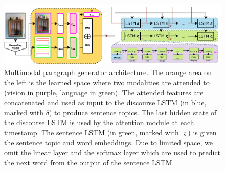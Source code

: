 \documentclass[11pt,a4paper]{article}
\newcommand{\kibitz}[2]{\ifnum\Comments=1\textcolor{#1}{#2}\fi}
\newcommand{\nikolai}[1]{\kibitz{red}   {[Nikolai: #1]}}
\begin{document}







\begin{figure}[t]
 \includegraphics[width=\linewidth]{figures/model}
 \caption{Multimodal paragraph generator architecture.
 		The orange area on the left is the learned space where two modalities are attended to (vision in purple, language in green).
		The attended features are concatenated and used as input to the discourse LSTM (in blue, marked with $\delta$) to produce sentence topics.
		The last hidden state of the discourse LSTM is used by the attention module at each timestamp.
		The sentence LSTM (in green, marked with $\varsigma$) is given the sentence topic and word embeddings.
		Due to limited space, we omit the linear layer and the softmax layer which are used to predict the next word from the output of the sentence LSTM.}
 \label{fig:model}
\end{figure}
\end{document}
